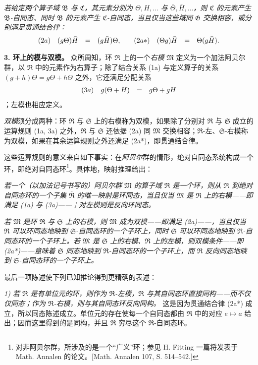 \documentclass[11pt]{article}
\providecommand{\frR}{\mathfrak R}
\providecommand{\frS}{\mathfrak S}
\providecommand{\frM}{\mathfrak M}
\providecommand{\frB}{\mathfrak B}
\providecommand{\frC}{\mathfrak C}
\providecommand{\frG}{\mathfrak G}
\begin{document}
\emph{若给定两个算子域 \(\frB\) 与 \(\frC\)，其元素分别为 \(\Theta,H,\ldots\) 与 \(\bar\Theta,\bar H,\ldots\)，则 \(\frC\) 的元素产生 \(\frB\)-自同态、同时 \(\frB\) 的元素产生 \(\frC\)-自同态，当且仅当这些域同 \(\frG\) 交换相容，或分别满足贯通结合律：}
\[
        \begin{array}{r@{\quad}c@{\quad}c@{\quad}c@{\qquad}r@{\quad}c@{\quad}c@{\quad}c}
        (2a) & (g\Theta)\bar H &=& (g\bar H)\Theta, &
        (2a*) & (\Theta g)\bar H &=& \Theta(g\bar H).
        \end{array}
\]

\noindent\textbf{3. 环上的模与双模。} 众所周知，环 \(\frR\) 上的一个\emph{右模} \(\frM\) 定义为一个加法阿贝尔群，以 \(\frR\) 中的元素作为右算子；除了结合关系 (1a) 与定义算子的关系 \((g+h)\Theta=g\Theta+h\Theta\) 之外，它还满足分配关系
\[
        \begin{array}{r@{\quad}c@{\quad}c@{\quad}c}
        (3a) & g(\Theta+H) &=& g\Theta+gH
        \end{array}
\]
；左模也相应定义。

\emph{双模}须分成两种：环 \(\frR\) 与 \(\frS\) 上的右模称为双模，如果除了分别对 \(\frR\) 与 \(\frS\) 成立的运算规则 (1a, 3a) 之外，\(\frR\) 与 \(\frS\) 还依据 (2a) 同 \(\frM\) 交换相容；\(\frR\)-左、\(\frS\)-右模称为双模，如果在其余运算规则之外还满足 (2a*)，即贯通结合律。

这些运算规则的意义来自如下事实：在\emph{阿贝尔}群的情形，绝对自同态系统构成一个环，即绝对自同态环\footnote{对非阿贝尔群，所涉及的是一个“广义”环；参见 H. Fitting 一篇将发表于 Math. Annalen 的论文。[Math. Annalen 107, S. 514--542.] }。具体地，映射推理给出：

\emph{若一个（以加法记号书写的）阿贝尔群 \(\frM\) 的算子域 \(\frR\) 是一个环，则从 \(\frR\) 到绝对自同态环的一个子集 \(\overline{\frR}\) 的唯一映射是环同态，当且仅当 \(\frM\) 是 \(\frR\) 上的右模——即满足 (1a) 与 (3a)——；对左模则是反向环同态。}

\emph{若 \(\frM\) 是环 \(\frR\) 与 \(\frS\) 上的右模，则 \(\frM\) 成为双模——即满足 (2a)——，当且仅当 \(\frR\) 可以环同态地映到 \(\frS\)-自同态环的一个子环上，同时 \(\frS\) 可以环同态地映到 \(\frR\)-自同态环的一个子环上。若 \(\frM\) 是 \(\frS\) 上的右模、\(\frR\) 上的左模，则双模条件——即 (2a*)——意味着 \(\frS\) 同态地映到 \(\frR\)-自同态环的一个子环上，而 \(\frR\) 反向同态地映到 \(\frS\)-自同态环的一个子环上。}

最后一项陈述使下列已知推论得到更精确的表述：

\emph{1) 若 \(\frR\) 是有单位元的环，则作为 \(\frR\)-左模，\(\frR\) 与其自同态环直接同构——而不仅仅同态；作为 \(\frR\)-右模，则与其自同态环反向同构。} 这是因为贯通结合律 (2a*) 成立，所以同态陈述成立。单位元的存在使每一个自同态都由 \(\frR\) 中的对应 \(e\mapsto a\) 给出；因而这里得到的是同构，并且 \(\frR\) 穷尽这个 \(\frR\)-自同态环。
\end{document}
